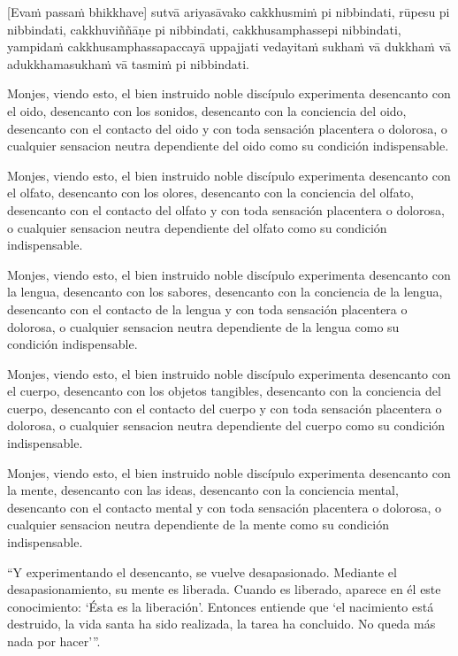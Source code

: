 [Evaṁ passaṁ bhikkhave] sutvā ariyasāvako cakkhusmiṁ pi nibbindati,
rūpesu pi nibbindati, cakkhuviññāṇe pi nibbindati, cakkhusamphassepi
nibbindati, yampidaṁ cakkhusamphassapaccayā uppajjati vedayitaṁ sukhaṁ
vā dukkhaṁ vā adukkhamasukhaṁ vā tasmiṁ pi nibbindati.

\clearpage

\englishText
\markboth{\englishTitle}{\rightmark}

Monjes, viendo esto, el bien instruido noble discípulo experimenta desencanto con el oido, desencanto con los sonidos, desencanto con la conciencia del oido, desencanto con el contacto del oido y con toda sensación placentera o dolorosa, o cualquier sensacion neutra dependiente del oido como su condición indispensable.

Monjes, viendo esto, el bien instruido noble discípulo experimenta desencanto con el olfato, desencanto con los olores, desencanto con la conciencia del olfato, desencanto con el contacto del olfato y con toda sensación placentera o dolorosa, o cualquier sensacion neutra dependiente del olfato como su condición indispensable.

Monjes, viendo esto, el bien instruido noble discípulo experimenta desencanto con la lengua, desencanto con los sabores, desencanto con la conciencia de la lengua, desencanto con el contacto de la lengua y con toda sensación placentera o dolorosa, o cualquier sensacion neutra dependiente de la lengua como su condición indispensable.

Monjes, viendo esto, el bien instruido noble discípulo experimenta desencanto con el cuerpo, desencanto con los objetos tangibles, desencanto con la conciencia del cuerpo, desencanto con el contacto del cuerpo y con toda sensación placentera o dolorosa, o cualquier sensacion neutra dependiente del cuerpo como su condición indispensable.


Monjes, viendo esto, el bien instruido noble discípulo experimenta desencanto con la mente, desencanto con las ideas, desencanto con la conciencia mental, desencanto con el contacto mental y con toda sensación placentera o dolorosa, o cualquier sensacion neutra dependiente de la mente como su condición indispensable.

“Y experimentando el desencanto, se vuelve desapasionado. Mediante el desapasionamiento, su mente es liberada. Cuando es liberado, aparece en él este conocimiento: ‘Ésta es la liberación’. Entonces entiende que ‘el nacimiento está destruido, la vida santa ha sido realizada, la tarea ha concluido. No queda más nada por hacer’”.

